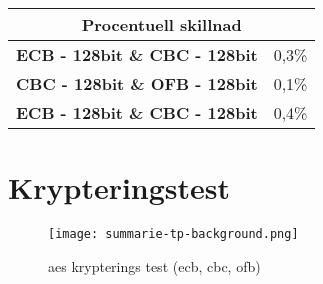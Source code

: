 \begin{table}[H]
  \centering
  \begin{tabular}{ |c|c| }
    \multicolumn{2}{c}{\bfseries{Procentuell skillnad}} \\
    \hline
    \bfseries{ECB - 128bit \& CBC - 128bit} & 0,3\% \\
    \hline
    \bfseries{CBC - 128bit \& OFB - 128bit} & 0,1\% \\
    \hline
    \bfseries{ECB - 128bit \& CBC - 128bit} & 0,4\% \\
    \hline
  \end{tabular}
\end{table}

\section{Krypteringstest}
\label{sec:krypterings-test}

\begin{figure}[H]
    \texttt{[image: summarie-tp-background.png]}
    \caption{\acrshort{aes} krypterings test (\acrshort{ecb}, \acrshort{cbc}, \acrshort{ofb})}
    \label{fig:aes-krypterings-test}
\end{figure}
